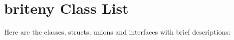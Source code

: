\section{briteny Class List}
Here are the classes, structs, unions and interfaces with brief descriptions:\begin{CompactList}
\item{}
\item{}
\end{CompactList}

